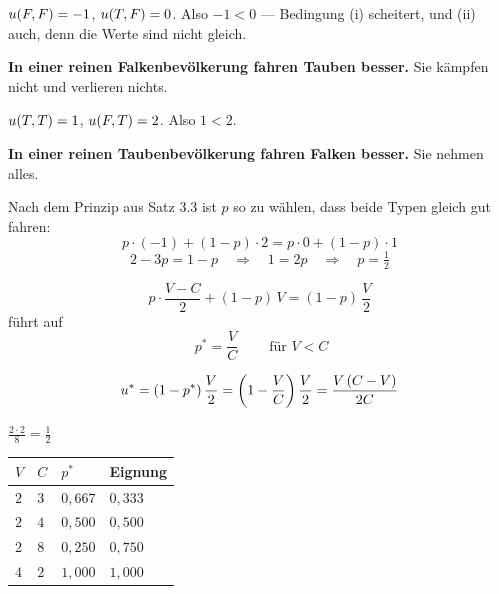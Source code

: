 \begin{merksatz}
 $u(F,F) = -1$, $u(T,F) = 0$. Also $-1 < 0$ --- Bedingung (i) scheitert, und (ii) auch, denn die Werte sind nicht gleich.

\begin{center}
\begin{minipage}{0.9\textwidth}
\textbf{In einer reinen Falkenbevölkerung fahren Tauben besser.} Sie kämpfen nicht und verlieren nichts.
\end{minipage}
\end{center}

 $u(T,T) = 1$, $u(F,T) = 2$. Also $1 < 2$.

\begin{center}
\begin{minipage}{0.9\textwidth}
\textbf{In einer reinen Taubenbevölkerung fahren Falken besser.} Sie nehmen alles.
\end{minipage}
\end{center}

Nach dem Prinzip aus Satz 3.3 ist $p$ so zu wählen, dass beide Typen gleich gut fahren:
\[ p\cdot(-1) + (1-p)\cdot2 = p\cdot0 + (1-p)\cdot1 \]
\[ 2-3p = 1-p \quad\Longrightarrow\quad 1 = 2p \quad\Longrightarrow\quad p = \tfrac12 \]

\[ p\cdot\frac{V-C}{2} + (1-p)\,V = (1-p)\,\frac{V}{2} \]
führt auf
\[ \boxed{\ p^{*} = \frac{V}{C}\ } \qquad\text{für } V < C \]

\[ u^{*} = (1-p^{*})\,\frac{V}{2} = \left(1-\frac VC\right)\frac V2 = \frac{V\,(C-V)}{2C} \]

 $\frac{2\cdot2}{8} = \tfrac12$ \checkmark

\begin{center}
{\small
\renewcommand{\arraystretch}{1.48}
\begin{tabular}{@{}P{1.4cm}P{1.4cm}P{1.8cm}P{2.2cm}@{}}
\toprule
$V$ & $C$ & $p^{*}$ & \textbf{Eignung}\\
\midrule
$2$ & $3$ & $0{,}667$ & $0{,}333$\\
$2$ & $4$ & $0{,}500$ & $0{,}500$\\
$2$ & $8$ & $0{,}250$ & $0{,}750$\\
$4$ & $2$ & $1{,}000$ & $1{,}000$\\
\bottomrule
\end{tabular}}
\end{center}


\end{merksatz}
